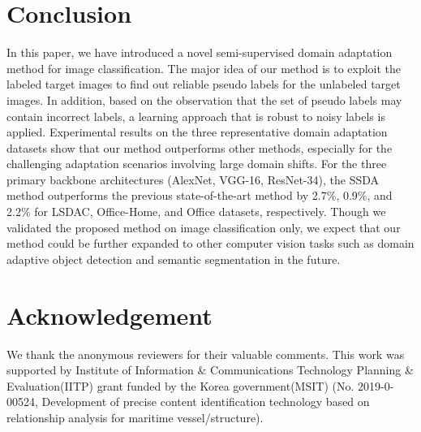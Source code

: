 \documentclass[a4paper,conference]{IEEEtran}
\begin{document}
\section{Conclusion}
\label{sec:conclusion}
In this paper, we have introduced a novel semi-supervised domain adaptation method for image classification. The major idea of our method is to exploit the labeled target images to find out reliable pseudo labels for the unlabeled target images. In addition, based on the observation that the set of pseudo labels may contain incorrect labels, a learning approach that is robust to noisy labels is applied. Experimental results on the three representative domain adaptation datasets show that our method outperforms other methods, especially for the challenging adaptation scenarios involving large domain shifts. For the three primary backbone architectures (AlexNet\cite{alex2012alexnet}, VGG-16\cite{vggnet}, ResNet-34\cite{resnet}), the SSDA method outperforms the previous state-of-the-art method by 2.7\%, 0.9\%, and 2.2\% for LSDAC\cite{peng2019moment}, Office-Home\cite{venkateswara2017deep}, and Office\cite{saenko2010adapting} datasets, respectively. \color{black} Though we validated the proposed method on image classification only, we expect that our method could be further expanded to other computer vision tasks such as domain adaptive object detection\cite{chen2018domain} and semantic segmentation\cite{hoffman2017cycada} in the future.


\section*{Acknowledgement}
We thank the anonymous reviewers for their valuable comments. This work was supported by Institute of Information \& Communications Technology Planning \& Evaluation(IITP) grant funded by the Korea government(MSIT) (No. 2019-0-00524, Development of precise content identification technology based on relationship analysis for maritime vessel/structure).





\end{document}
